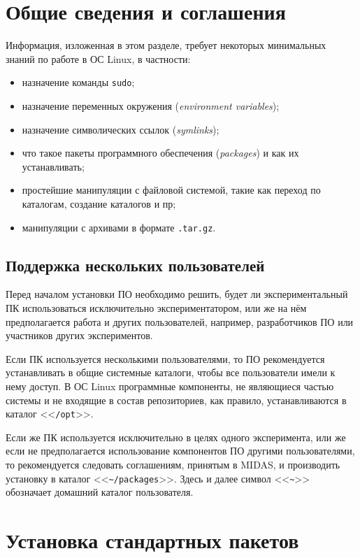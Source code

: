 \documentclass[12pt, a4paper, oneside, onecolumn]{book}
\newcommand{\MIDAS}{\mbox{MIDAS}}
\newcommand{\APP}[1]{\mbox{\tt #1}}
\newcommand{\TERM}[1]{{\it #1}}
\newcommand{\DIRECTORY}[1]{<<{\tt #1}>>}
\begin{document}
\section{Общие сведения и соглашения}

Информация, изложенная в этом разделе, требует некоторых минимальных знаний по работе в ОС Linux, в частности:

\begin{itemize}
\item назначение команды \APP{sudo};
\item назначение переменных окружения (\TERM{environment variables});
\item назначение символических ссылок (\TERM{symlinks});
\item что такое пакеты программного обеспечения (\TERM{packages}) и как их устанавливать;
\item простейшие манипуляции с файловой системой, такие как переход по каталогам, создание каталогов и пр;
\item манипуляции с архивами в формате {\tt .tar.gz}.
\end{itemize}

\subsection{Поддержка нескольких пользователей}
\label{sec_multiuser}

Перед началом установки ПО необходимо решить, будет ли экспериментальный ПК использоваться исключительно экспериментатором, или же на нём предполагается работа и других пользователей, например, разработчиков ПО или участников других экспериментов.

Если ПК используется несколькими пользователями, то ПО рекомендуется устанавливать в общие системные каталоги, чтобы все пользователи имели к нему доступ. В ОС Linux программные компоненты, не являющиеся частью системы и не входящие в состав репозиториев, как правило, устанавливаются в каталог \DIRECTORY{/opt}.

Если же ПК используется исключительно в целях одного эксперимента, или же если не предполагается использование компонентов ПО другими пользователями, то рекомендуется следовать соглашениям, принятым в \MIDAS{}, и производить установку в каталог \DIRECTORY{\~{}/packages}. Здесь и далее символ \DIRECTORY{\~{}} обозначает домашний каталог пользователя.

\section{Установка стандартных пакетов}
\end{document}
